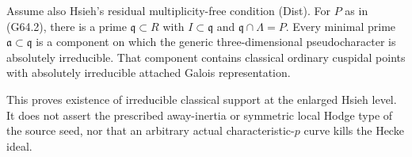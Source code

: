 \begin{proposition}
\label{AC-G64-stable}
Assume also Hsieh's residual multiplicity-free condition
\textup{(Dist)}.  For $P$ as in (G64.2), there is a prime
$\mathfrak q\subset R$ with $I\subset\mathfrak q$ and
$\mathfrak q\cap\Lambda=P$.
Every minimal prime $\mathfrak a\subset\mathfrak q$ is a
component on which the generic three-dimensional pseudocharacter
is absolutely irreducible.  That component contains classical
ordinary cuspidal points with absolutely irreducible attached
Galois representation.

This proves existence of irreducible classical support at the
enlarged Hsieh level.  It does not assert the prescribed away-inertia
or symmetric local Hodge type of the source seed, nor that an
arbitrary actual characteristic-$p$ curve kills the Hecke ideal.
\end{proposition}
